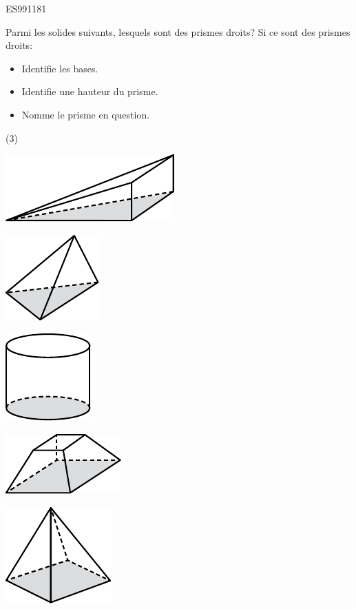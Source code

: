 \documentclass[a4paper,11pt]{report}
\begin{document}
\begin{exol}{ES99}{118}{1}
\end{exol}
\begin{exop}{
Parmi les solides suivants, lesquels sont des prismes droits? Si ce sont des prismes droits:
\begin{itemize}
	\item Identifie les bases.
	\item Identifie une hauteur du prisme.
	\item Nomme le prisme en question.
\end{itemize}
\begin{tasks}(3)
	\task 

\includegraphics[scale=1]{media/es-21/pq1}
	\task 

\includegraphics[scale=1]{media/es-21/pq2}
	\task 

\includegraphics[scale=1]{media/es-21/pq3}
	\task 

\includegraphics[scale=1]{media/es-21/pq4}
	\task 

\includegraphics[scale=1]{media/es-21/pq5}
	\task 


\end{tasks}}
\end{exop}
\end{document}
